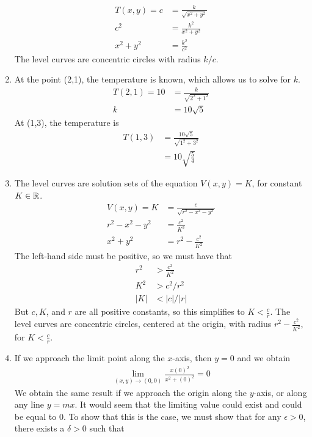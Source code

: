 \documentclass{article}
\begin{document}
\begin{enumerate}
\begin{align*}
  T(x,y) = c &= \frac{k}{\sqrt{x^2 + y^2}} \\
  c^2 &= \frac{k^2}{x^2 + y^2} \\
  x^2 + y^2 &= \frac{k^2}{c^2}
\end{align*} 
The level curves are concentric circles with radius $k/c$. 
\item At the point (2,1), the temperature is known, which allows us to solve for $k$. 
\begin{align*}
  T(2,1) = 10 &= \frac{k}{\sqrt{2^2 + 1^2}}\\
  k& = 10\sqrt{5}
\end{align*} 
At (1,3), the temperature is
\begin{align*}
  T(1,3) &= \frac{10\sqrt{5}}{\sqrt{1^2 + 3^2}}\\
  & = 10\sqrt{\frac{5}{4}}
\end{align*} 
\EEN
\item The level curves are solution sets of the equation $V(x,y) = K$, for constant $K\in\mathbb{R}$.
\begin{align*}
V(x,y) = K &= \frac{c}{\sqrt{r^2 - x^2 -y^2}} \\
r^2-x^2-y^2 &= \frac{c^2}{K^2} \\
x^2+y^2 &= r^2 -  \frac{c^2}{K^2}
\end{align*}
The left-hand side must be positive, so we must have that 
\begin{align*}
r^2 &>  \frac{c^2}{K^2}\\
K^2 &> c^2/r^2\\
 |K| &<  |c|/|r|
\end{align*}
But $c, K$, and $r$ are all positive constants, so this simplifies to $K<\frac{c}{r}$. The level curves are concentric circles, centered at the origin, with radius $r^2 -  \frac{c^2}{K^2}$, for $K<\frac{c}{r}$.
\item 
If we approach the limit point along the $x$-axis, then $y=0$ and we obtain
\begin{align*}
  \lim_{(x,y)\rightarrow(0,0) } \frac{x(0)^2}{x^2+(0)^2} = 0
\end{align*}
We obtain the same result if we approach the origin along the $y$-axis, or along any line $y=mx$. It would seem that the limiting value could exist and could be equal to 0. To show that this is the case, we must show that for any $\epsilon > 0$, there exists a $\delta > 0$ such that   

\end{enumerate}
\end{document}
